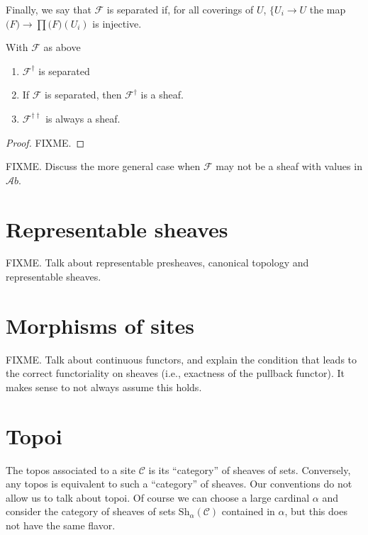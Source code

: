 \smallskip\noindent
Finally, we say that $\mathcal{F}$ is separated if, for all coverings
of $U$, $\{U_i \rightarrow U$ the map 
$\mathcal(F) \rightarrow \prod \mathcal(F)(U_i)$ is injective.

\begin{theorem}
With $\mathcal{F}$ as above
\begin{enumerate}
\item $\mathcal{F}^\dagger$ is separated
\item If $\mathcal{F}$ is separated, then $\mathcal{F}^\dagger$ is a sheaf.
\item $\mathcal{F}^{\dagger\dagger}$ is always a sheaf.
\end{enumerate}
\end{theorem}

\begin{proof}
FIXME.
\end{proof}

\noindent
FIXME. Discuss the more general case when $\mathcal{F}$ may not be a sheaf with
values in $\mathcal{A}b$.

\section{Representable sheaves}
\label{section-representable-sheaves}

\noindent
FIXME. Talk about representable presheaves, canonical topology and
representable sheaves.

\section{Morphisms of sites}
\label{section-morphism-sites}

\noindent
FIXME. Talk about continuous functors, and explain the condition that leads to
the correct functoriality on sheaves (i.e., exactness of the pullback functor).
It makes sense to not always assume this holds.

\section{Topoi}

\noindent
The topos associated to a site $\mathcal{C}$ is its ``category'' of sheaves of
sets. Conversely, any topos is equivalent to such a ``category'' of sheaves.
Our conventions do not allow us to talk about topoi. Of course we can choose a
large cardinal $\alpha$ and consider the category of sheaves of sets
$\text{Sh}_\alpha(\mathcal{C})$ contained in $\alpha$, but this does not have
the same flavor.

